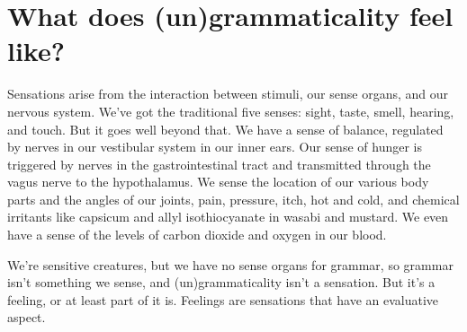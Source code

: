 



\section{What does (un)grammaticality feel like?}

Sensations arise from the interaction between stimuli, our sense organs, and our nervous system. We've got the traditional five senses: sight, taste, smell, hearing, and touch. But it goes well beyond that. We have a sense of balance, regulated by nerves in our vestibular system in our inner ears. Our sense of hunger is triggered by nerves in the gastrointestinal tract and transmitted through the vagus nerve to the hypothalamus. We sense the location of our various body parts and the angles of our joints, pain, pressure, itch, hot and cold, and chemical irritants like capsicum and allyl isothiocyanate in wasabi and mustard. We even have a sense of the levels of carbon dioxide and oxygen in our blood.

We're sensitive creatures, but we have no sense organs for grammar, so grammar isn't something we sense, and (un)grammaticality isn't a sensation. But it's a feeling, or at least part of it is. Feelings are sensations that have an evaluative aspect.

